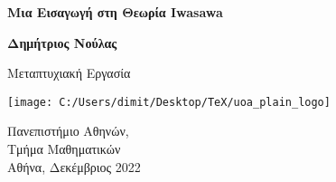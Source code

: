 \documentclass{report}
\begin{document}
	
	
	
	

\begin{titlepage}
\begin{center}
		
	\LARGE
	\textbf{Μια Εισαγωγή στη Θεωρία {Iwasawa}}
		
	\vspace{0.5cm}
	\Large
		
	\vspace{1.5cm}
		
	\textbf{Δημήτριος Νούλας}
		
	\vspace{1.5cm}
		
	Μεταπτυχιακή Εργασία

	\vfill
	
		
	\texttt{[image: C:/Users/dimit/Desktop/TeX/uoa\_plain\_logo]} 
	
	\Large 
	Πανεπιστήμιο Αθηνών, \\
	Τμήμα Μαθηματικών\\ 
	\vspace{0.5cm}
	Αθήνα, Δεκέμβριος 2022
\end{center}
\end{titlepage}
\pagebreak
\newpage 
\end{document}
